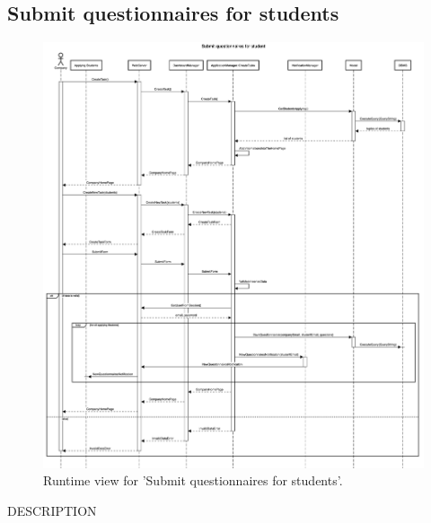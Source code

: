 \subsection{Submit questionnaires for students}
\begin{figure}[H]
    \begin{center}
        \includegraphics[width=0.8\linewidth]{DD/LaTeX/Images/RuntimeView/SubmitQuestionnaires.png}
        \caption{Runtime view for 'Submit questionnaires for students'.}
        \label{fig:runtime_SubmitQuestionnaires}%
    \end{center}
\end{figure}

DESCRIPTION



